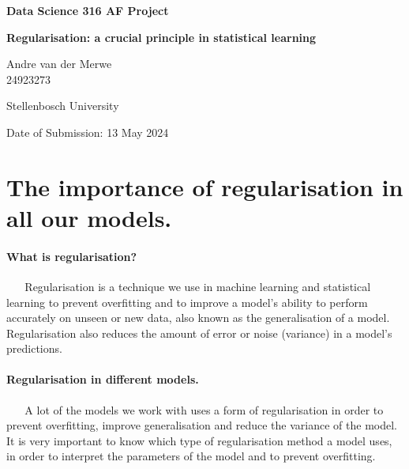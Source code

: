 \documentclass[12pt]{article}
\begin{document}
\begin{titlepage}
    \centering
    \vspace*{1cm} %
    {\Large\bfseries Data Science 316 AF Project\par}
    \vspace{2cm} %
    {\Large\textbf{Regularisation: a crucial principle in statistical learning}\par}
    \vspace{1cm} %
    {\large Andre van der Merwe \\ 24923273\par}

    \vfill %
    {\large Stellenbosch University\par}
    \vspace{0.5cm} %
    {\large Date of Submission: 13 May 2024\par}
\end{titlepage}

\newpage

\section*{The importance of regularisation in all our models.}
\paragraph{What is regularisation?}~
\newline~
Regularisation is a technique we use in machine learning and statistical learning to prevent overfitting and
to improve a model's ability to perform accurately on unseen or new data, also known as the generalisation of a model.
Regularisation also reduces the amount of error or noise (variance) in a model's predictions. 

\paragraph{Regularisation in different models.}~
\newline~
A lot of the models we work with uses a form of regularisation in order to prevent overfitting, improve generalisation and
reduce the variance of the model. It is very important to know which type of regularisation method a model uses, in order 
to interpret the parameters of the model and to prevent overfitting.
\end{document}
